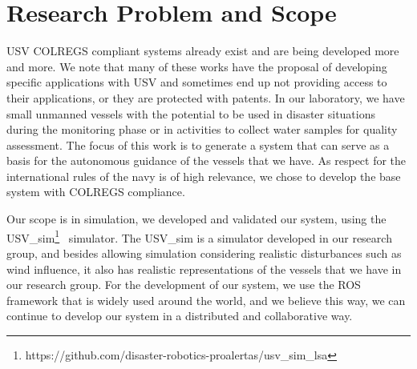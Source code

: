     
    \section{Research Problem and Scope}
    
    
    \ac{USV} \ac{COLREGS} compliant systems already exist and are being developed more and more. We note that many of these works have the proposal of developing specific applications with \ac{USV} and sometimes end up not providing access to their applications, or they are protected with patents. In our laboratory, we have small unmanned vessels with the potential to be used in disaster situations during the monitoring phase or in activities to collect water samples for quality assessment. The focus of this work is to generate a system that can serve as a basis for the autonomous guidance of the vessels that we have. As respect for the international rules of the navy is of high relevance, we chose to develop the base system with \ac{COLREGS} compliance.
    
    Our scope is in simulation, we developed and validated our system, using the USV\_sim\footnote{https://github.com/disaster-robotics-proalertas/usv\_sim\_lsa}~\cite{Paravisi2018Toward} simulator.
    The USV\_sim is a simulator developed in our research group, and besides allowing simulation considering realistic disturbances such as wind influence, it also has realistic representations of the vessels that we have in our research group. For the development of our system, we use the \ac{ROS}~\cite{Quigley2009ROS} framework that is widely used around the world, and we believe this way, we can continue to develop our system in a distributed and collaborative way.
    
    
